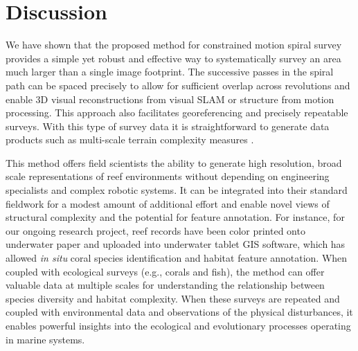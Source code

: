 \section{Discussion}
We have shown that the proposed method for constrained motion spiral survey provides a simple yet robust and effective way to systematically survey an area much larger than a single image footprint. The successive passes in the spiral path can be spaced precisely to allow for sufficient overlap across revolutions and enable 3D visual reconstructions from visual SLAM or structure from motion processing. This approach also facilitates georeferencing and precisely repeatable surveys. With this type of survey data it is straightforward to generate data products such as multi-scale terrain complexity measures \cite{Friedman_2012}.

This method offers field scientists the ability to generate high resolution, broad scale representations of reef environments without depending on engineering specialists and complex robotic systems. It can be integrated into their standard fieldwork for a modest amount of additional effort and enable novel views of structural complexity and the potential for feature annotation. For instance, for our ongoing research project, reef records have been color printed onto underwater paper and uploaded into underwater tablet GIS software, which has allowed \textit{in situ} coral species identification and habitat feature annotation. When coupled with ecological surveys (e.g., corals and fish), the method can offer valuable data at multiple scales for understanding the relationship between species diversity and habitat complexity. When these surveys are repeated and coupled with environmental data and observations of the physical disturbances, it enables powerful insights into the ecological and evolutionary processes operating in marine systems.

